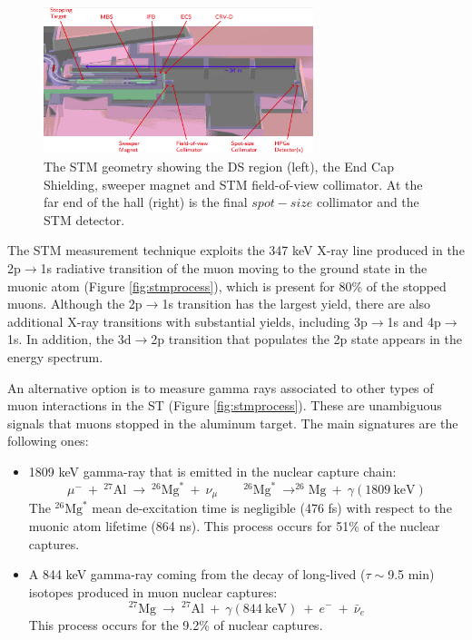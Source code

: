 \begin{figure}[!h]
    \centering
    \includegraphics[width =0.7\textwidth]{figures/png/Screenshot_20240306_180910.png}
    \caption[The Stopping Target Monitor geometry.]{The STM geometry showing the DS region (left), 
    the End Cap Shielding, sweeper magnet and STM field-of-view collimator. 
    At the far end of the hall (right) is the final $spot-size$ collimator and the STM detector.}
    \label{fig:stm}
    \end{figure}
    The STM measurement technique exploits the 347 keV X-ray line produced in the 2p$\rightarrow$1s 
    radiative transition of the muon moving to the ground state in the muonic atom (Figure \ref{fig:stmprocess}), 
    which is present for 80\% of the stopped muons. Although the 2p$\rightarrow$1s transition has the 
    largest yield, there are also additional X-ray transitions with substantial yields, 
    including 3p$\rightarrow$1s and 4p$\rightarrow$1s. In addition, the 3d$\rightarrow$2p 
    transition that populates the 2p state appears in the energy spectrum.

  An alternative option is to measure gamma rays associated to other types of muon interactions in the ST (Figure \ref{fig:stmprocess}).
    These are unambiguous signals that muons stopped in the aluminum target. 
    The main signatures are the following ones: 
    \begin{itemize}
    \item 1809 keV gamma-ray that is emitted in the nuclear capture chain:
    \begin{equation}
        \mu^- \ + \ ^{27}\text{Al} \ \rightarrow \ ^{26}\text{Mg}^* \ + \ \nu_\mu \quad \quad ^{26}\text{Mg}^* \ \rightarrow ^{26}\text{Mg} \ + \ \gamma(1809 \ \text{keV})
     \end{equation}
     The $^{26}\text{Mg}^*$ mean de-excitation time is negligible (476 fs) with 
     respect to the muonic atom lifetime (864 ns). 
     This process occurs for 51\% of the nuclear captures.
     \item  A 844 keV gamma-ray coming from the decay of 
       long-lived ($\tau \sim$9.5 min) isotopes produced in muon nuclear captures:       
     \begin{equation}
        ^{27}\text{Mg} \ \rightarrow \ ^{27}\text{Al} \ + \ \gamma(844 \ \text{keV}) \ + \ e^- \ + \ \bar{\nu}_e
     \end{equation}
     This process occurs for the 9.2\% of nuclear captures.
\end{itemize}


